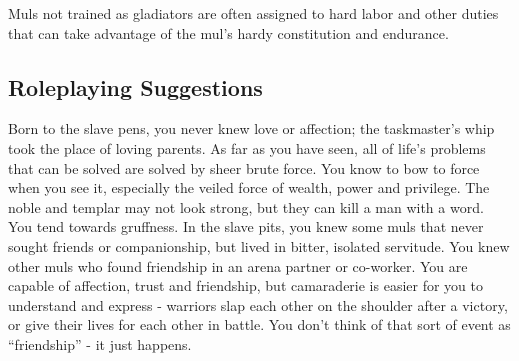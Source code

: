 Muls not trained as gladiators are often assigned to hard labor and other duties that can take advantage of the mul's hardy constitution and endurance.

\subsection{Roleplaying Suggestions}
Born to the slave pens, you never knew love or affection; the taskmaster's whip took the place of loving parents. As far as you have seen, all of life's problems that can be solved are solved by sheer brute force. You know to bow to force when you see it, especially the veiled force of wealth, power and privilege. The noble and templar may not look strong, but they can kill a man with a word. You tend towards gruffness. In the slave pits, you knew some muls that never sought friends or companionship, but lived in bitter, isolated servitude. You knew other muls who found friendship in an arena partner or co-worker. You are capable of affection, trust and friendship, but camaraderie is easier for you to understand and express - warriors slap each other on the shoulder after a victory, or give their lives for each other in battle. You don't think of that sort of event as ``friendship'' - it just happens.

